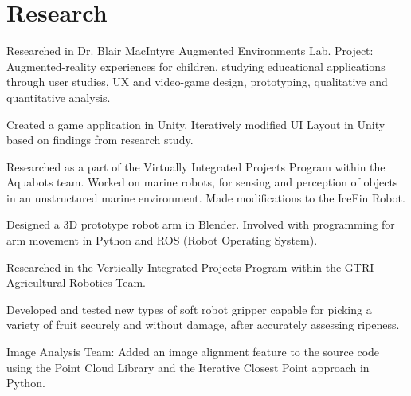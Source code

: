 \documentclass[]{deedy-resume-openfont}
\begin{document}

\section{Research}
\begin{tightemize}
\item Researched in Dr. Blair MacIntyre Augmented Environments Lab. Project: Augmented-reality experiences for children, studying educational applications through user studies, UX and video-game design, prototyping, qualitative and quantitative analysis. \\ 
\item Created a game application in Unity. Iteratively modified UI Layout in Unity based on findings from research study.  
\end{tightemize}
\sectionsep

\begin{tightemize}
\item Researched as a part of the Virtually Integrated Projects Program within the Aquabots team. Worked on marine robots, for sensing and perception of objects in an unstructured marine environment. Made modifications to the IceFin Robot. 
\item Designed a 3D prototype robot arm in Blender. Involved with programming for arm movement in Python and ROS (Robot Operating System).
\end{tightemize}
\sectionsep

\begin{tightemize}
\item Researched in the Vertically Integrated Projects Program within the GTRI Agricultural Robotics Team.
\item Developed and tested new types of soft robot gripper capable for picking a variety of fruit securely and without damage, after accurately assessing ripeness. 
\item Image Analysis Team: Added an image alignment feature to the source code using the Point Cloud Library and the Iterative Closest Point approach in Python.
\end{tightemize}
\sectionsep
\end{document}
